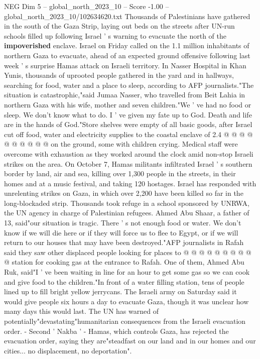\begin{textsample}{NEG Dim 5 – global\_north\_2023\_10 – Score -1.00 – global\_north\_2023\_10/102634620.txt}  \label{ex:f5_neg_030}
Thousands of Palestinians have gathered in the south of the Gaza Strip, laying out beds on the streets after UN-run schools filled up following Israel ' s warning to evacuate the north of the \textbf{impoverished} enclave.
Israel on Friday called on the 1.1 million inhabitants of northern Gaza to evacuate, ahead of an expected ground offensive following last week ' s surprise Hamas attack on Israeli territory.
In Nasser Hospital in Khan Yunis, thousands of uprooted people gathered in the yard and in hallways, searching for food, water and a place to sleep, according to AFP journalists."The situation is catastrophic,"said Jumaa Nasser, who travelled from Beit Lahia in northern Gaza with his wife, mother and seven children."We ' ve had no food or sleep.
We don't know what to do.
I ' ve given my fate up to God.
Death and life are in the hands of God."Store shelves were empty of all basic goods, after Israel cut off food, water and electricity supplies to the coastal enclave of 2.4 @ @ @ @ @ @ @ @ @ @ on the ground, some with children crying.
Medical staff were overcome with exhaustion as they worked around the clock amid non-stop Israeli strikes on the area.
On October 7, Hamas militants infiltrated Israel ' s southern border by land, air and sea, killing over 1,300 people in the streets, in their homes and at a music festival, and taking 120 hostages.
Israel has responded with unrelenting strikes on Gaza, in which over 2,200 have been killed so far in the long-blockaded strip.
Thousands took refuge in a school sponsored by UNRWA, the UN agency in charge of Palestinian refugees.
Ahmed Abu Shaar, a father of 13, said"our situation is tragic.
There ' s not enough food or water.
We don't know if we will die here or if they will force us to flee to Egypt, or if we will return to our houses that may have been destroyed."AFP journalists in Rafah said they saw other displaced people looking for places to @ @ @ @ @ @ @ @ @ @ station for cooking gas at the entrance to Rafah.
One of them, Ahmed Abu Ruk, said"I ' ve been waiting in line for an hour to get some gas so we can cook and give food to the children."In front of a water filling station, tens of people lined up to fill bright yellow jerrycans.
The Israeli army on Saturday said it would give people six hours a day to evacuate Gaza, though it was unclear how many days this would last.
The UN has warned of potentially"devastating"humanitarian consequences from the Israeli evacuation order. - Second ' Nakba ' - Hamas, which controls Gaza, has rejected the evacuation order, saying they are"steadfast on our land and in our homes and our cities... no displacement, no deportation".

\end{textsample}
